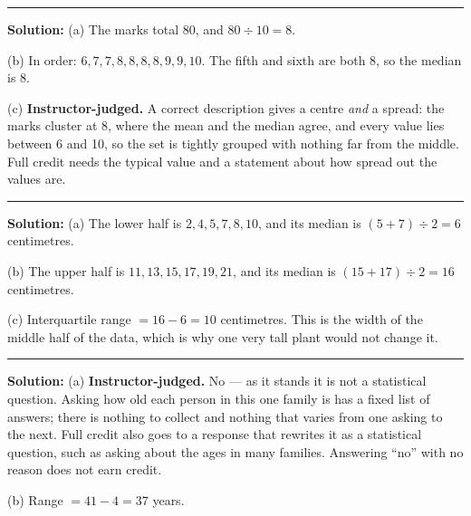 \documentclass[12pt]{article}
\begin{document}
\vspace{0.25cm}\noindent\rule{\linewidth}{0.2pt}\vspace{0.25cm}


\textbf{Solution:} (a) The marks total 80, and $80 \div 10 = 8$. 

(b) In order: $6, 7, 7, 8, 8, 8, 8, 9, 9, 10$. The fifth and sixth are both 8,
so the median is 8. 

(c) \textbf{Instructor-judged.} A correct description gives a centre \emph{and}
a spread: the marks cluster at 8, where the mean and the median agree, and every
value lies between 6 and 10, so the set is tightly grouped with nothing far from
the middle. Full credit needs the typical value and a statement about how spread
out the values are.

\vspace{0.25cm}\noindent\rule{\linewidth}{0.2pt}\vspace{0.25cm}


\textbf{Solution:} (a) The lower half is $2, 4, 5, 7, 8, 10$, and its median is
$(5 + 7) \div 2 = 6$ centimetres. 

(b) The upper half is $11, 13, 15, 17, 19, 21$, and its median is
$(15 + 17) \div 2 = 16$ centimetres. 

(c) Interquartile range $= 16 - 6 = 10$ centimetres. This is the width of the
middle half of the data, which is why one very tall plant would not change
it. 

\vspace{0.25cm}\noindent\rule{\linewidth}{0.2pt}\vspace{0.25cm}


\textbf{Solution:} (a) \textbf{Instructor-judged.} No --- as it stands it is not
a statistical question. Asking how old each person in this one family is has a
fixed list of answers; there is nothing to collect and nothing that varies from
one asking to the next. Full credit also goes to a response that rewrites it as
a statistical question, such as asking about the ages in many families. Answering
``no'' with no reason does not earn credit.

(b) Range $= 41 - 4 = 37$ years. 
\end{document}
